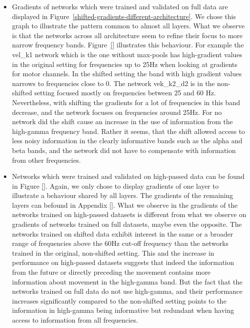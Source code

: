 \begin{itemize}
    \item Gradients of networks which were trained and validated on full data are displayed in Figure~\ref{shifted-gradients-different-architecture}.
    We chose this graph to illustrate the pattern common to almost all layers.
    What we observe is that the networks across all architecture seem to refine their focus to more narrow frequency bands.
    Figure~\ref{} illustrates this behaviour.
    For example the vel\_k1 network which is the one without max-pools has high-gradient values in the original setting for frequencies up to 25Hz when looking at gradients for motor channels.
    In the shifted setting the band with high gradient values narrows to frequencies close to 0.
    The network vek\_k2\_d2 is in the non-shifted setting focused mostly on frequencies between 25 and 60 Hz. Nevertheless, with shifting the gradients for a lot of frequencies in this band decrease, and the network focuses on frequencies around 25Hz. For no network did the shift cause an increase in the use of information from the high-gamma frequency band.
    Rather it seems, that the shift allowed access to less noisy information in the clearly informative bands such as the alpha and beta bands, and the network did not have to compensate with information from other frequencies.
    \item Networks which were trained and validated on high-passed data can be found in Figure \ref{}.
    Again, we only chose to display gradients of one layer to illustrate a behaviour shared by all layers. The gradients of the remaining layers can befound in Appendix \ref{}.
    What we observe in the gradients of the networks trained on high-passed datasets is different from what we observe on gradients of networks trained on full datasets, maybe even the opposite.
    The networks trained on shifted data exhibit interest in the same or a broader range of frequencies above the 60Hz cut-off frequency than the networks trained in the original, non-shifted setting.
    This and the increase in performance on high-passed datasets suggests that indeed the information from the future or directly preceding the movement contains more information about movement in the high-gamma band.
    But the fact that the networks trained on full data do not use high-gamma, and their performance increases significantly compared to the non-shifted setting points to the information in high-gamma being informative but redundant when having access to information from all frequencies.
\end{itemize}

